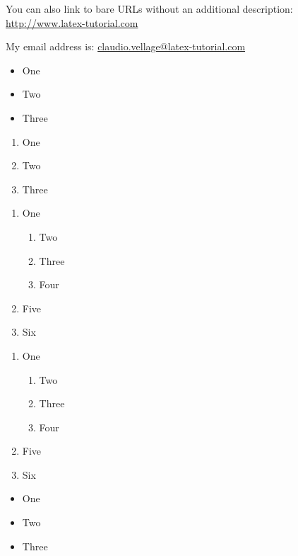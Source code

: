 \documentclass{article}
\begin{document}
	You can also link to bare URLs without an additional description: \url{http://www.latex-tutorial.com}
	
	My email address is: \href{mailto:claudio.vellage@latex-tutorial.com}{claudio.vellage@latex-tutorial.com}
	
	
	\begin{itemize}
		\item One
		\item Two
		\item Three
	\end{itemize}


\begin{enumerate}
	\item One
	\item Two
	\item Three
\end{enumerate}


\begin{enumerate}[label=(\roman*)]
	\item One
	\begin{enumerate}
		\item Two
		\item Three
		\item Four
	\end{enumerate}
	\item Five
	\item Six
\end{enumerate}


\begin{enumerate}
	\item One
	\begin{enumerate}[label=\alph*)]
		\item Two
		\item Three
		\item Four
	\end{enumerate}
	\item Five
	\item Six
\end{enumerate}


\begin{itemize}[label=$\ast$]
	\item One
	\item Two
	\item Three
\end{itemize}
\end{document}
